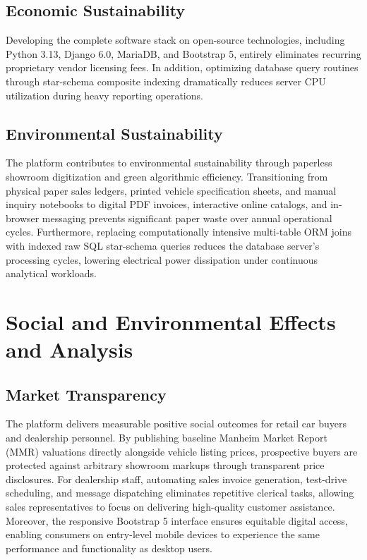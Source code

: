 \subsection{Economic Sustainability}
Developing the complete software stack on open-source technologies, including Python 3.13, Django 6.0, MariaDB, and Bootstrap 5, entirely eliminates recurring proprietary vendor licensing fees. In addition, optimizing database query routines through star-schema composite indexing dramatically reduces server CPU utilization during heavy reporting operations.

\subsection{Environmental Sustainability}
The platform contributes to environmental sustainability through paperless showroom digitization and green algorithmic efficiency. Transitioning from physical paper sales ledgers, printed vehicle specification sheets, and manual inquiry notebooks to digital PDF invoices, interactive online catalogs, and in-browser messaging prevents significant paper waste over annual operational cycles. Furthermore, replacing computationally intensive multi-table ORM joins with indexed raw SQL star-schema queries reduces the database server's processing cycles, lowering electrical power dissipation under continuous analytical workloads.

\section{Social and Environmental Effects and Analysis}

\subsection{Market Transparency}
The platform delivers measurable positive social outcomes for retail car buyers and dealership personnel. By publishing baseline Manheim Market Report (MMR) valuations directly alongside vehicle listing prices, prospective buyers are protected against arbitrary showroom markups through transparent price disclosures. For dealership staff, automating sales invoice generation, test-drive scheduling, and message dispatching eliminates repetitive clerical tasks, allowing sales representatives to focus on delivering high-quality customer assistance. Moreover, the responsive Bootstrap 5 interface ensures equitable digital access, enabling consumers on entry-level mobile devices to experience the same performance and functionality as desktop users.

